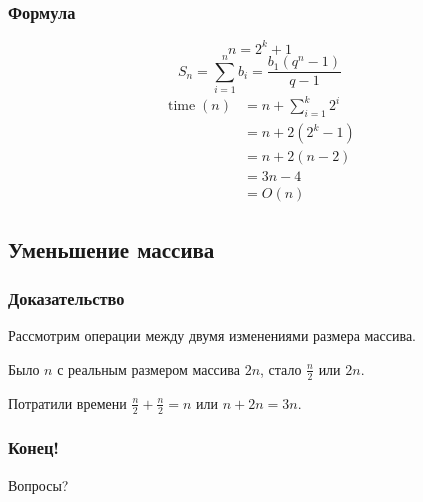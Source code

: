 \documentclass[pdf,russian,aspectratio=169]{beamer}
\begin{document}
\begin{frame}
  \frametitle{Формула}
  \[
    n = 2^k + 1
  \]
  \pause
  \[
    S_n=\sum_{i=1}^n b_i = \frac{b_1(q^n-1)}{q-1}
  \]
  \pause
  \begin{align*}
    \operatorname{time}(n) &= n + \sum_{i=1}^k 2^i\\
    &= n + 2(2^k-1)\\
    &=n+2(n-2)\\
    &=3n-4\\
    &=O(n)
  \end{align*}
\end{frame}

\subsection{Уменьшение массива}

\begin{frame}
  \frametitle{Доказательство}
  Рассмотрим операции между двумя изменениями размера массива.

  \pause
  Было $n$ с реальным размером массива $2n$, стало $\frac{n}{2}$ или $2n$.

  \pause
  Потратили времени $\frac{n}{2} + \frac{n}{2} = n$ или $n+2n=3n$.
\end{frame}

\begin{frame}
  \frametitle{Конец!}
  Вопросы?
\end{frame}
\end{document}
